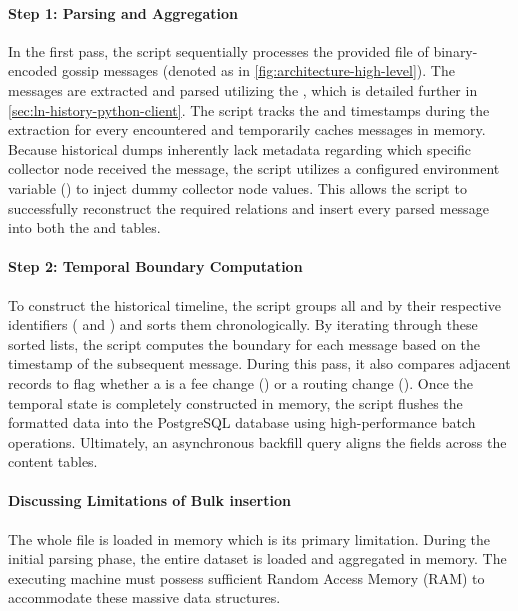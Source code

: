 \paragraph{Step 1: Parsing and Aggregation}
In the first pass, the script sequentially processes the provided file of binary-encoded 
gossip messages (denoted as  in \autoref{fig:architecture-high-level}).
The messages are extracted and parsed utilizing the , 
which is detailed further in \autoref{sec:ln-history-python-client}.
The script tracks the  and  timestamps during the extraction
for every encountered  and temporarily caches  messages in memory.
Because historical dumps inherently lack metadata regarding which specific collector node received the message, 
the script utilizes a configured environment variable () to inject dummy collector node values. 
This allows the script to successfully reconstruct the required relations and insert every parsed message
into both the  and  tables.


\paragraph{Step 2: Temporal Boundary Computation}
To construct the historical timeline, the script groups all  and 
by their respective identifiers ( and ) and sorts them chronologically. 
By iterating through these sorted lists, the script computes the  boundary for each message 
based on the  timestamp of the subsequent message. 
During this pass, it also compares adjacent records to flag whether a  is
a fee change () or a routing change ().
Once the temporal state is completely constructed in memory, 
the script flushes the formatted data into the PostgreSQL database using high-performance batch operations.
Ultimately, an asynchronous backfill query aligns the  fields across the content tables.

\paragraph{Discussing Limitations of Bulk insertion}
The whole  file is loaded in memory which is its primary limitation. 
During the initial parsing phase, the entire  dataset is loaded and aggregated in memory.
The executing machine must possess sufficient Random Access Memory (RAM) to accommodate these massive data structures.

